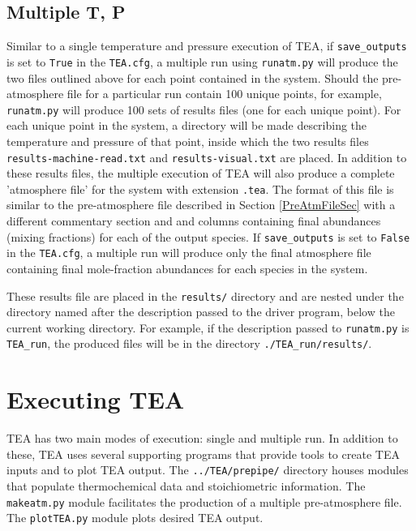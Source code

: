 {  
\subsection{Multiple T, P}
\label{MultiTPSec}
Similar to a single temperature and pressure execution of TEA, if
\texttt{save\_outputs} is set to \texttt{True} in the \texttt{TEA.cfg}, a
multiple  run using \texttt{runatm.py} will produce the two
files outlined above for each  point contained in the
system.  Should the pre-atmosphere file for a particular run contain
100 unique  points, for example, \texttt{runatm.py} will
produce 100 sets of results files (one for each unique 
point).  For each unique  point in the system, a directory
will be made describing the temperature and pressure of that point,
inside which the two results files \texttt{results-machine-read.txt} and
\texttt{results-visual.txt} are placed. In addition to these results files,
the multiple  execution of TEA will also produce a complete
'atmosphere file' for the system with extension \texttt{.tea}.  The
format of this file is similar to the pre-atmosphere file described in
Section \ref{PreAtmFileSec} with a different commentary section and
and columns containing final abundances (mixing fractions) for each of
the output species. If \texttt{save\_outputs} is set to \texttt{False}
in the \texttt{TEA.cfg}, a multiple  run will produce only
the final atmosphere file containing final mole-fraction abundances
for each species in the system.

 These results file are placed in the \texttt{results/} directory and
 are nested under the directory named after the description passed to
 the driver program, below the current working directory. For example,
 if the description passed to \texttt{runatm.py} is \texttt{TEA\_run},
 the produced files will be in the
 directory \texttt{./TEA\_run/results/}.


\section{Executing TEA}
\label{runTEA}

TEA has two main modes of execution: single  and multiple
 run. In addition to these, TEA uses several supporting
programs that provide tools to create TEA inputs and to plot TEA
output. The \texttt{../TEA/prepipe/} directory houses modules that
populate thermochemical data and stoichiometric information. The
\texttt{makeatm.py} module facilitates the production of a multiple
 pre-atmosphere file. The \texttt{plotTEA.py}
module plots desired TEA output.

}
